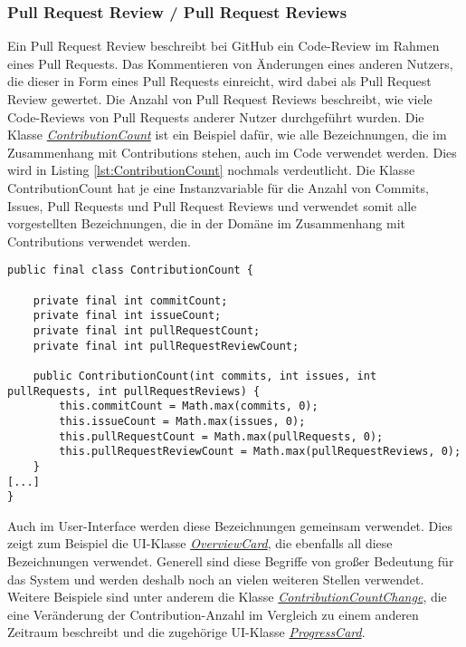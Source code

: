 \subsubsection*{Pull Request Review / Pull Request Reviews}
\label{sec:PullRequestReviews}
Ein Pull Request Review beschreibt bei GitHub ein Code-Review im Rahmen eines Pull Requests.
Das Kommentieren von Änderungen eines anderen Nutzers, die dieser in Form eines Pull Requests einreicht, wird dabei als Pull Request Review gewertet.
Die Anzahl von Pull Request Reviews beschreibt, wie viele Code-Reviews von Pull Requests anderer Nutzer durchgeführt wurden.
\newline
\newline
Die Klasse \href{https://github.com/lukaspanni/OpenSourceStats/blob/main/app/src/main/java/de/lukaspanni/opensourcestats/data/ContributionCount.java}{\textit{ContributionCount}} ist ein Beispiel dafür, wie alle Bezeichnungen, die im Zusammenhang mit Contributions stehen, auch im Code verwendet werden.
Dies wird in Listing \ref{lst:ContributionCount} nochmals verdeutlicht.
Die Klasse ContributionCount hat je eine Instanzvariable für die Anzahl von Commits, Issues, Pull Requests und Pull Request Reviews und verwendet somit alle vorgestellten Bezeichnungen, die in der Domäne im Zusammenhang mit Contributions verwendet werden.
\begin{lstlisting}[caption={Auszug aus der Klasse ContributionCount}, captionpos=b, label={lst:ContributionCount}]
public final class ContributionCount {

    private final int commitCount;
    private final int issueCount;
    private final int pullRequestCount;
    private final int pullRequestReviewCount;

    public ContributionCount(int commits, int issues, int pullRequests, int pullRequestReviews) {
        this.commitCount = Math.max(commits, 0);
        this.issueCount = Math.max(issues, 0);
        this.pullRequestCount = Math.max(pullRequests, 0);
        this.pullRequestReviewCount = Math.max(pullRequestReviews, 0);
    }
[...]
}
\end{lstlisting}
Auch im User-Interface werden diese Bezeichnungen gemeinsam verwendet.
Dies zeigt zum Beispiel die UI-Klasse \href{https://github.com/lukaspanni/OpenSourceStats/blob/main/app/src/main/java/de/lukaspanni/opensourcestats/ui/custom_elements/card/OverviewCard.java}{\textit{OverviewCard}}, die ebenfalls all diese Bezeichnungen verwendet.
\newline
Generell sind diese Begriffe von großer Bedeutung für das System und werden deshalb noch an vielen weiteren Stellen verwendet.
Weitere Beispiele sind unter anderem die Klasse \href{https://github.com/lukaspanni/OpenSourceStats/blob/main/app/src/main/java/de/lukaspanni/opensourcestats/data/ContributionCountChange.java}{\textit{ContributionCountChange}}, die eine Veränderung der Contribution-Anzahl im Vergleich zu einem anderen Zeitraum beschreibt und die zugehörige UI-Klasse \href{https://github.com/lukaspanni/OpenSourceStats/blob/main/app/src/main/java/de/lukaspanni/opensourcestats/ui/custom_elements/card/ProgressCard.java}{\textit{ProgressCard}}.



